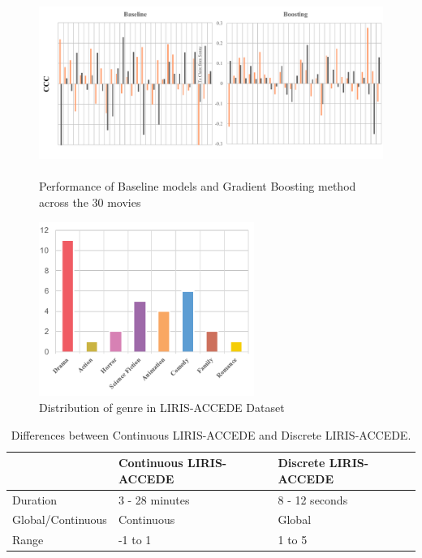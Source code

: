 \documentclass{article}
\begin{document}
\begin{figure}[t]
\includegraphics[width=\textwidth, height = 6cm]{images/comparison2.pdf}
\centering
\caption{Performance of Baseline models and Gradient Boosting method across the 30 movies}
\label{comparison}
\end{figure}

\begin{figure}[t]
\includegraphics[width=7cm]{genre2}
\centering
\caption{Distribution of genre in LIRIS-ACCEDE Dataset}
\label{genre}
\end{figure}

\begin{table}[t]
\centering
\begin{tabular}{|l|p{2.2cm}|p{2.2cm}|}
\hline
				& Continuous LIRIS-ACCEDE	& Discrete LIRIS-ACCEDE \\ \hline
Duration			& 3 - 28 minutes			& 8 - 12 seconds		\\ \hline	
Global/Continuous	& Continuous				& Global 				\\ \hline
Range			& -1 to 1					& 1 to 5				\\ \hline
\end{tabular}
\caption{Differences between Continuous LIRIS-ACCEDE and Discrete LIRIS-ACCEDE.}
\label{differences}
\end{table}
\end{document}
